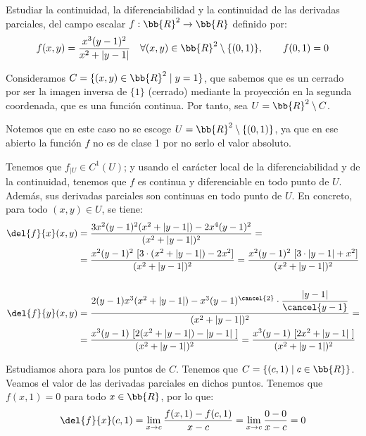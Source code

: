 \begin{ejercicio}
    Estudiar la continuidad, la diferenciabilidad y la continuidad de las derivadas parciales, del campo escalar $f:\bb{R}^2\to \bb{R}$ definido por:
    \begin{equation*}
        f(x,y)=\frac{x^3(y-1)^2}{x^2+|y-1|} \quad
        \forall (x,y)\in \bb{R}^2\setminus \{(0,1)\},\qquad f(0,1)=0
    \end{equation*}

    Consideramos $C=\{(x,y)\in \bb{R}^2\mid y=1\}$, que sabemos que es un cerrado por ser la imagen inversa de $\{1\}$ (cerrado) mediante la proyección en la segunda coordenada, que es una función continua. Por tanto, sea $U=\bb{R}^2\setminus C$.
    \begin{observacion}
        Notemos que en este caso no se escoge $U=\bb{R}^2\setminus \{(0,1)\}$, ya que en ese abierto la función $f$ no es de clase 1 por no serlo el valor absoluto.
    \end{observacion}

    Tenemos que $f_{\big| U}\in C^1({U})$; y usando el carácter local de la diferenciabilidad y de la continuidad, tenemos que $f$ es continua y diferenciable en todo punto de $U$. Además, sus derivadas parciales son continuas en todo punto de $U$. En concreto, para todo $(x,y)\in U$, se tiene:
    \begin{equation*}\begin{split}
        \del{f}{x}(x,y)&=
        \frac{3x^2(y-1)^2(x^2+|y-1|)-2x^4(y-1)^2}{(x^2+|y-1|)^2}=\\
        &=
        \frac{x^2(y-1)^2~[3\cdot(x^2+|y-1|)-2x^2]}{(x^2+|y-1|)^2}
        = \frac{x^2(y-1)^2~[3\cdot|y-1|+x^2]}{(x^2+|y-1|)^2} \\ &\\
        \del{f}{y}(x,y)&=
        \frac{2(y-1)x^3(x^2+|y-1|)-x^3(y-1)^{\cancel{2}}\cdot \dfrac{|y-1|}{\cancel{y-1}}}{(x^2+|y-1|)^2} =\\
        &=
        \frac{x^3(y-1)~[2(x^2+|y-1|)-|y-1|~]}{(x^2+|y-1|)^2}
        =
        \frac{x^3(y-1)~[2x^2+|y-1|~]}{(x^2+|y-1|)^2}
    \end{split}\end{equation*}

    Estudiamos ahora para los puntos de $C$. Tenemos que $C=\{(c,1)\mid c\in \bb{R}\}$. Veamos el valor de las derivadas parciales en dichos puntos. Tenemos que $f(x,1)=0$ para todo $x\in \bb{R}$, por lo que:
    \begin{equation*}
        \del{f}{x}(c,1) = \lim_{x\to c}\frac{f(x,1) - f(c,1)}{x-c}
        =\lim_{x\to c}\frac{0 - 0}{x-c} = 0
    \end{equation*}


\end{ejercicio}
